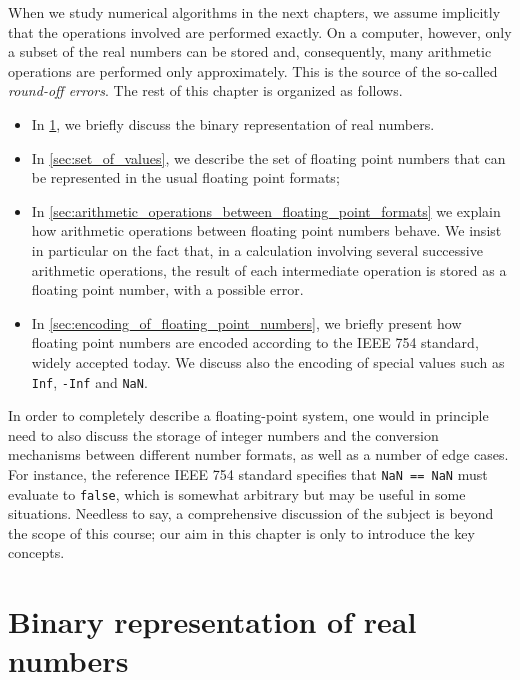 When we study numerical algorithms in the next chapters,
we assume implicitly that the operations involved are performed exactly.
On a computer, however, only a subset of the real numbers can be stored and,
consequently, many arithmetic operations are performed only approximately.
This is the source of the so-called \emph{round-off errors}.
The rest of this chapter is organized as follows.
\begin{itemize}
    \item
        In \cref{sec:binary_representation_of_real_numbers},
        we briefly discuss the binary representation of real numbers.
    \item
        In \cref{sec:set_of_values},
        we describe the set of floating point numbers that can be represented in the usual floating point formats;
    \item
        In \cref{sec:arithmetic_operations_between_floating_point_formats}
        we explain how arithmetic operations between floating point numbers behave.
        We insist in particular on the fact that,
        in a calculation involving several successive arithmetic operations,
        the result of each intermediate operation is stored as a floating point number,
        with a possible error.
    \item
        In \cref{sec:encoding_of_floating_point_numbers},
        we briefly present how floating point numbers are encoded
        according to the IEEE 754 standard, widely accepted today.
        We discuss also the encoding of special values such as \texttt{Inf}, \texttt{-Inf} and \texttt{NaN}.
\end{itemize}
In order to completely describe a floating-point system,
one would in principle need to also discuss the storage of integer numbers
and the conversion mechanisms between different number formats,
as well as a number of edge cases.
For instance, the reference IEEE 754 standard specifies that \texttt{NaN == NaN} must evaluate to \texttt{false},
which is somewhat arbitrary but may be useful in some situations.
Needless to say,
a comprehensive discussion of the subject is beyond the scope of this course;
our aim in this chapter is only to introduce the key concepts.

\section{Binary representation of real numbers}%
\label{sec:binary_representation_of_real_numbers}

